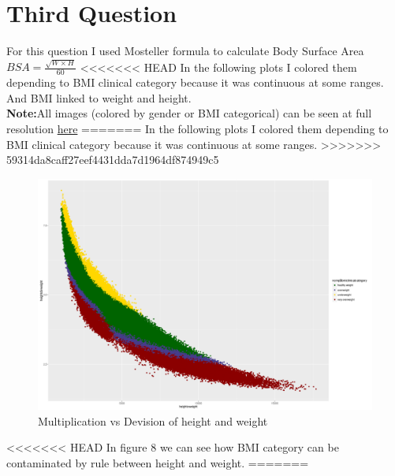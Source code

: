 \documentclass{article}
\begin{document}
	\section*{Third Question}
	For this question I used Mosteller formula to calculate Body Surface Area \(BSA =\frac{\sqrt{W\times H}}{60}\)
<<<<<<< HEAD
	In the following plots I colored them depending to BMI clinical category because it was continuous at some ranges. And BMI linked to weight and height.\\ \textbf{Note:}All images (colored by gender or BMI categorical) can be seen at full resolution \href{https://github.com/aqeel13932/DM/tree/master/HW04}{here}
=======
	In the following plots I colored them depending to BMI clinical category because it was continuous at some ranges. 
>>>>>>> 59314da8caff27eef4431dda7d1964df874949c5
	\begin{figure}[H]
		\begin{center}
			\includegraphics[scale=0.4]{xdiv.png}
		\end{center}
		\caption{Multiplication vs Devision of height and weight }
	\end{figure}
<<<<<<< HEAD
	In figure 8 we can see how BMI category can be contaminated by rule between height and weight.
=======
	
\end{document}
